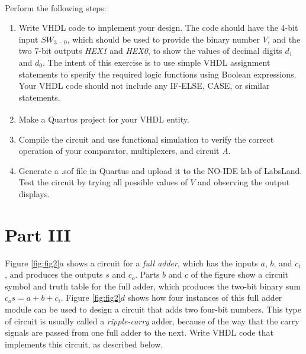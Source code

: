\documentclass[epsfig,10pt,fullpage]{article}
\begin{document}
~\\
Perform the following steps:

\begin{enumerate}
\item Write VHDL code to implement your design. The code
should have the 4-bit input $SW_{3-0}$, which should be
used to provide the binary number $V$, and the two 7-bit outputs {\it HEX1} and {\it HEX0},
to show the values of decimal digits $d_1$ and $d_0$. 
The intent of this exercise is to use simple VHDL assignment
statements to specify the required logic functions using Boolean
expressions. Your VHDL code should not include any IF-ELSE, CASE, or
similar statements. 
\item Make a Quartus\textsuperscript{\textregistered} project for your VHDL entity.
\item Compile the circuit and use functional simulation to verify the correct operation of
your comparator, multiplexers, and circuit {\it A}.
\item Generate a .sof file in Quartus and upload it to the NO-IDE lab of LabsLand. Test the circuit by trying all possible
values of $V$ and observing the output displays.
\end{enumerate}

\section*{Part III}
Figure \ref{fig:fig2}$a$ shows a circuit for a {\it full adder}, 
which has the inputs $a$, $b$, and $c_i$,
and produces the outputs $s$ and $c_o$. Parts $b$ and $c$ of the figure show a circuit
symbol and truth table for the full adder, which produces the two-bit binary sum
$c_o s = a + b + c_i$. Figure \ref{fig:fig2}$d$ shows how four instances of this full adder module
can be used to design a circuit that adds two four-bit numbers. This type of circuit is
usually called a {\it ripple-carry} adder, because of the way that the carry signals are 
passed from one full adder to the next. Write VHDL code that implements this circuit,
as described below.
\end{document}
